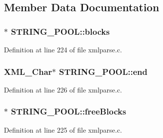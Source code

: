 \subsection{Member Data Documentation}
\subsubsection[{\texorpdfstring{blocks}{blocks}}]{$\ast$ S\+T\+R\+I\+N\+G\+\_\+\+P\+O\+O\+L\+::blocks}\hypertarget{struct_s_t_r_i_n_g___p_o_o_l_a2749a1cd489203ac4bd3b4fbc7381e6e}{}\label{struct_s_t_r_i_n_g___p_o_o_l_a2749a1cd489203ac4bd3b4fbc7381e6e}


Definition at line 224 of file xmlparse.\+c.

\subsubsection[{\texorpdfstring{end}{end}}]{ {\bf X\+M\+L\+\_\+\+Char}$\ast$ S\+T\+R\+I\+N\+G\+\_\+\+P\+O\+O\+L\+::end}\hypertarget{struct_s_t_r_i_n_g___p_o_o_l_a0046b4cdb4af2e088deaface848b4308}{}\label{struct_s_t_r_i_n_g___p_o_o_l_a0046b4cdb4af2e088deaface848b4308}


Definition at line 226 of file xmlparse.\+c.

\subsubsection[{\texorpdfstring{free\+Blocks}{freeBlocks}}]{$\ast$ S\+T\+R\+I\+N\+G\+\_\+\+P\+O\+O\+L\+::free\+Blocks}\hypertarget{struct_s_t_r_i_n_g___p_o_o_l_a7b4dbf3b86fb43e042972b153be00727}{}\label{struct_s_t_r_i_n_g___p_o_o_l_a7b4dbf3b86fb43e042972b153be00727}


Definition at line 225 of file xmlparse.\+c.


